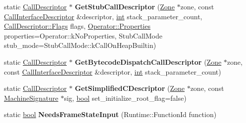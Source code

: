 \begin{DoxyCompactItemize}
\item 
\mbox{\label{classv8_1_1internal_1_1compiler_1_1Linkage_a2b0dbc4b94bbd47c7242ffeb36533998}} 
static \mbox{\hyperlink{classv8_1_1internal_1_1compiler_1_1CallDescriptor}{Call\+Descriptor}} $\ast$ {\bfseries Get\+Stub\+Call\+Descriptor} (\mbox{\hyperlink{classv8_1_1internal_1_1Zone}{Zone}} $\ast$zone, const \mbox{\hyperlink{classv8_1_1internal_1_1CallInterfaceDescriptor}{Call\+Interface\+Descriptor}} \&descriptor, \mbox{\hyperlink{classint}{int}} stack\+\_\+parameter\+\_\+count, \mbox{\hyperlink{classv8_1_1base_1_1Flags}{Call\+Descriptor\+::\+Flags}} flags, \mbox{\hyperlink{classv8_1_1base_1_1Flags}{Operator\+::\+Properties}} properties=Operator\+::k\+No\+Properties, Stub\+Call\+Mode stub\+\_\+mode=Stub\+Call\+Mode\+::k\+Call\+On\+Heap\+Builtin)
\item 
\mbox{\label{classv8_1_1internal_1_1compiler_1_1Linkage_a88e939466a32cff30b872e2b3059fb45}} 
static \mbox{\hyperlink{classv8_1_1internal_1_1compiler_1_1CallDescriptor}{Call\+Descriptor}} $\ast$ {\bfseries Get\+Bytecode\+Dispatch\+Call\+Descriptor} (\mbox{\hyperlink{classv8_1_1internal_1_1Zone}{Zone}} $\ast$zone, const \mbox{\hyperlink{classv8_1_1internal_1_1CallInterfaceDescriptor}{Call\+Interface\+Descriptor}} \&descriptor, \mbox{\hyperlink{classint}{int}} stack\+\_\+parameter\+\_\+count)
\item 
\mbox{\label{classv8_1_1internal_1_1compiler_1_1Linkage_a3edd7f4433b17693cd6de2a29ca29001}} 
static \mbox{\hyperlink{classv8_1_1internal_1_1compiler_1_1CallDescriptor}{Call\+Descriptor}} $\ast$ {\bfseries Get\+Simplified\+C\+Descriptor} (\mbox{\hyperlink{classv8_1_1internal_1_1Zone}{Zone}} $\ast$zone, const \mbox{\hyperlink{classv8_1_1internal_1_1Signature}{Machine\+Signature}} $\ast$sig, \mbox{\hyperlink{classbool}{bool}} set\+\_\+initialize\+\_\+root\+\_\+flag=false)
\item 
\mbox{\label{classv8_1_1internal_1_1compiler_1_1Linkage_a0094a30afc798b41953ae18e95304003}} 
static \mbox{\hyperlink{classbool}{bool}} {\bfseries Needs\+Frame\+State\+Input} (Runtime\+::\+Function\+Id function)
\item 
\mbox{\label{classv8_1_1internal_1_1compiler_1_1Linkage_a31ce646746b89a4b0530561108277f9b}} 

\end{DoxyCompactItemize}

